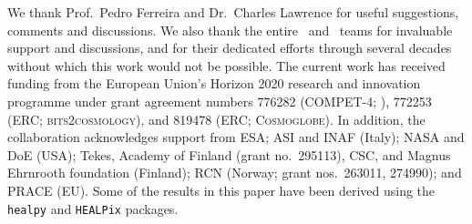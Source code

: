 \begin{acknowledgements}
  We thank Prof.\ Pedro Ferreira and Dr.\ Charles Lawrence for useful suggestions, comments and 
  discussions. We also thank the entire \Planck\ and \WMAP\ teams for
  invaluable support and discussions, and for their dedicated efforts
  through several decades without which this work would not be
  possible. The current work has received funding from the European
  Union’s Horizon 2020 research and innovation programme under grant
  agreement numbers 776282 (COMPET-4; \BP), 772253 (ERC;
  \textsc{bits2cosmology}), and 819478 (ERC; \textsc{Cosmoglobe}). In
  addition, the collaboration acknowledges support from ESA; ASI and
  INAF (Italy); NASA and DoE (USA); Tekes, Academy of Finland (grant
   no.\ 295113), CSC, and Magnus Ehrnrooth foundation (Finland); RCN
  (Norway; grant nos.\ 263011, 274990); and PRACE (EU). Some of the results 
  in this paper have been derived using the \texttt{healpy} \citep{zonca2019} 
  and \texttt{HEALPix} \citep{gorski2005} packages.
\end{acknowledgements}
